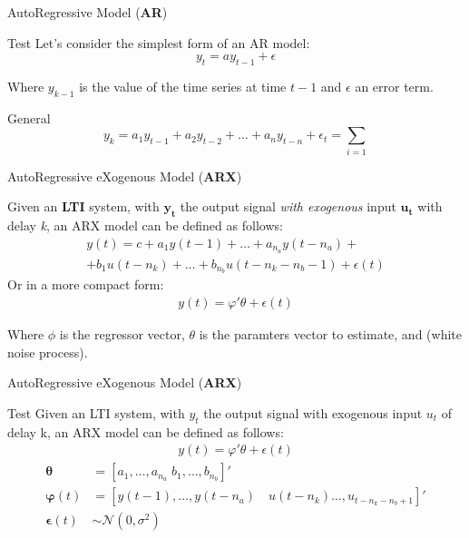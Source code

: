 \documentclass[aspectratio=169,hyperref={pdfpagelabels=false}]{beamer}
\begin{document}
\begin{frame}{AutoRegressive Model (\textbf{AR})}
\begin{block}{Test}
  Let's consider the simplest form of an AR model:
  \begin{equation*}
    y_{t} = a y_{t-1} + \epsilon
  \end{equation*}
\end{block}
  Where $y_{k-1}$ is the value of the time series at time $t-1$ and $\epsilon$ an error term. 
  \begin{block}{General}
    \begin{equation*}
      y_{k} = a_{1}y_{t-1} + a_{2}y_{t-2} + \dots + a_{n}y_{t-n} + \epsilon_t = \sum_{i=1}
    \end{equation*}
  \end{block}
\end{frame}

\begin{frame}{AutoRegressive eXogenous Model (\textbf{ARX})}
  \begin{block}{}
    Given an \textbf{LTI} system, with $\bm{y_t}$ the output signal \textit{with exogenous} input $\bm{u_t}$ with delay \textit{k}, an ARX model can be defined as follows:
    \begin{align*}
      y(t) = c + a_{1}y(t-1) + \dots + a_{n_a}y(t-n_a) + \\ 
              + b_{1}u(t-n_k) + \dots + b_{n_b}u(t-n_k-n_b-1) + \epsilon(t)      
    \end{align*}
    Or in a more compact form: 
    \begin{align*}
      y(t) = \varphi'\theta + \epsilon(t)
    \end{align*}

  Where $\phi$ is the regressor vector, $\theta$ is the paramters vector to estimate, and  (white noise process). 
  \end{block}
  \end{frame}

  \begin{frame}{AutoRegressive eXogenous Model (\textbf{ARX})}
    \begin{block}{Test}
      Given an LTI system, with $y_t$ the output signal with exogenous input $u_t$ of delay k, an ARX model can be defined as follows:
      \vspace{1em}
      \begin{align*}
        \boxed{y(t) = \varphi'\theta + \epsilon(t)}
      \end{align*}
    \begin{align*}
      \bm{\theta} &= [a_1, \dots, a_{n_a} \; b_1, \dots, b_{n_b}]' \\
      \bm{\varphi}(t) &= [y(t-1), \dots, y(t-n_a) \quad u(t-n_k) \dots, u_{t-n_k-n_b+1}]' \\
      \bm{\epsilon}(t) &\sim \mathcal{N}(0,\sigma^2)
    \end{align*}
    \end{block}
    \end{frame}
\end{document}
